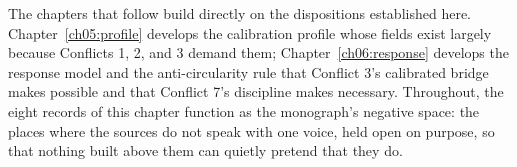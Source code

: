 The chapters that follow build directly on the dispositions established
here. Chapter~\ref{ch05:profile} develops the calibration profile whose
fields exist largely because Conflicts 1, 2, and 3 demand them;
Chapter~\ref{ch06:response} develops the response model and the
anti-circularity rule that Conflict 3's calibrated bridge makes possible and
that Conflict 7's discipline makes necessary. Throughout, the eight records
of this chapter function as the monograph's negative space: the places where
the sources do not speak with one voice, held open on purpose, so that
nothing built above them can quietly pretend that they do.
